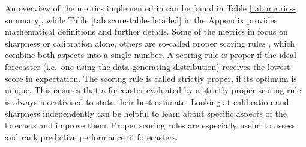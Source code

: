 \documentclass[
]{jss}
\begin{document}
An overview of the metrics implemented in  can be
found in Table \ref{tab:metrics-summary}, while Table
\ref{tab:score-table-detailed} in the Appendix provides mathematical
definitions and further details. Some of the metrics in
 focus on sharpness or calibration alone, others are
so-called proper scoring rules
\citep{gneitingStrictlyProperScoring2007}, which combine both aspects
into a single number. A scoring rule is proper if the ideal forecaster
(i.e.~one using the data-generating distribution) receives the lowest
score in expectation. The scoring rule is called strictly proper, if its
optimum is unique. This ensures that a forecaster evaluated by a
strictly proper scoring rule is always incentivised to state their best
estimate. Looking at calibration and sharpness independently can be
helpful to learn about specific aspects of the forecasts and improve
them. Proper scoring rules are especially useful to assess and rank
predictive performance of forecasters.

\newpage
\end{document}
